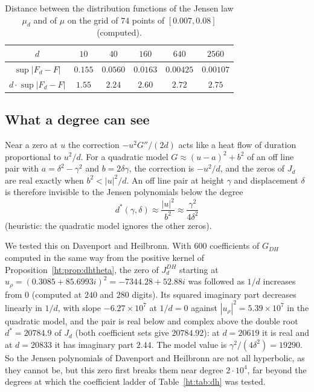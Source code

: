 \begin{table}[ht]
\centering\small
\begin{tabular}{cccccc}
\toprule
$d$ & $10$ & $40$ & $160$ & $640$ & $2560$\\
\midrule
$\sup|F_d-F|$ & $0.155$ & $0.0560$ & $0.0163$ & $0.00425$ & $0.00107$\\
$d\cdot\sup|F_d-F|$ & $1.55$ & $2.24$ & $2.60$ & $2.72$ & $2.75$\\
\bottomrule
\end{tabular}
\caption{Distance between the distribution functions of the Jensen law $\mu_d$ and of $\mu$ on the grid of $74$ points of $[0.007,0.08]$ (computed).}\label{ht:tab:jlaw}
\end{table}

\subsection{What a degree can see}
Near a zero at $u$ the correction $-u^2G''/(2d)$ acts like a heat flow of duration proportional to $u^2/d$. For a quadratic model $G\approx(u-a)^2+b^2$ of an off line pair with $a=\delta^2-\gamma^2$ and $b=2\delta\gamma$, the correction is $-u^2/d$, and the zeros of $J_d$ are real exactly when $b^2<|u|^2/d$. An off line pair at height $\gamma$ and displacement $\delta$ is therefore invisible to the Jensen polynomials below the degree
\[
d^*(\gamma,\delta)\approx\frac{|u|^2}{b^2}\approx\frac{\gamma^2}{4\delta^2}
\]
(heuristic: the quadratic model ignores the other zeros).

We tested this on Davenport and Heilbronn. With $600$ coefficients of $G_{DH}$ computed in the same way from the positive kernel of Proposition~\ref{ht:prop:dhtheta}, the zero of $J_d^{DH}$ starting at $u_\rho=(0.3085+85.6993i)^2=-7344.28+52.88i$ was followed as $1/d$ increases from $0$ (computed at $240$ and $280$ digits). Its squared imaginary part decreases linearly in $1/d$, with slope $-6.27\times10^7$ at $1/d=0$ against $|u_\rho|^2=5.39\times10^7$ in the quadratic model, and the pair is real below and complex above the double root $d^*=20784.9$ of $J_d$ (both coefficient sets give $20784.92$): at $d=20619$ it is real and at $d=20833$ it has imaginary part $2.44$. The model value is $\gamma^2/(4\delta^2)=19290$. So the Jensen polynomials of Davenport and Heilbronn are not all hyperbolic, as they cannot be, but this zero first breaks them near degree $2\cdot10^4$, far beyond the degrees at which the coefficient ladder of Table~\ref{ht:tab:dh} was tested.

